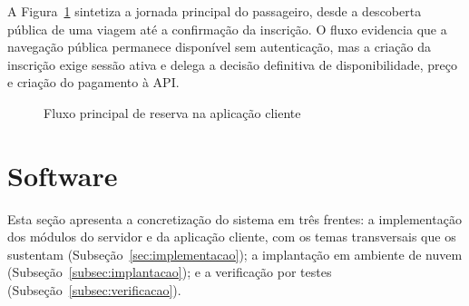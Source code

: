 \documentclass[12pt,openright,oneside,a4paper]{article}
\begin{document}
A Figura~\ref{fig:fe_fluxo_reserva} sintetiza a jornada principal do passageiro, desde a descoberta pública de uma viagem até a confirmação da inscrição. O fluxo evidencia que a navegação pública permanece disponível sem autenticação, mas a criação da inscrição exige sessão ativa e delega a decisão definitiva de disponibilidade, preço e criação do pagamento à API.

\begin{figure}[H]
\centering
\setlength{\fboxsep}{8pt}
\caption{Fluxo principal de reserva na aplicação cliente}
\label{fig:fe_fluxo_reserva}
\end{figure}



\section{Software}

Esta seção apresenta a concretização do sistema em três frentes: a implementação dos módulos do servidor e da aplicação cliente, com os temas transversais que os sustentam (Subseção~\ref{sec:implementacao}); a implantação em ambiente de nuvem (Subseção~\ref{subsec:implantacao}); e a verificação por testes (Subseção~\ref{subsec:verificacao}).
\end{document}
